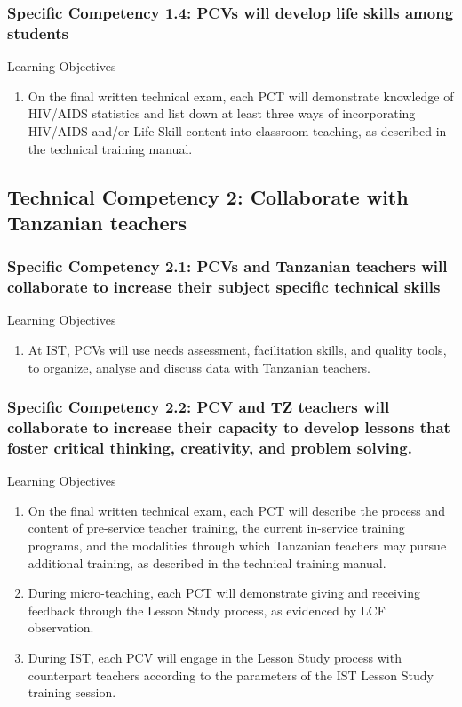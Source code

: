 \subsubsection*{Specific Competency 1.4: PCVs will develop life skills among students}

Learning Objectives
\begin{enumerate}
\item On the final written technical exam, each PCT will demonstrate knowledge of HIV/AIDS statistics and list down at least three ways of incorporating HIV/AIDS and/or Life Skill content into classroom teaching,
as described in the technical training manual.
\end{enumerate}

\subsection*{Technical Competency 2: Collaborate with Tanzanian teachers}

\subsubsection*{Specific Competency 2.1: PCVs and Tanzanian teachers
will collaborate to increase their subject specific technical skills}

Learning Objectives
\begin{enumerate}
\item At IST, PCVs will use needs assessment, facilitation skills, and quality
tools, to organize, analyse and discuss data with Tanzanian teachers.
\end{enumerate}

\subsubsection*{Specific Competency 2.2: PCV and TZ teachers will collaborate to increase their capacity to develop lessons
that foster critical thinking, creativity, and problem
solving.}

Learning Objectives
\begin{enumerate}
\item On the final written technical exam, each PCT will describe the process
and content of pre-service teacher training, the current in-service training programs, and the modalities through which Tanzanian teachers
may pursue additional training, as described in the technical training
manual.

\item During micro-teaching, each PCT will demonstrate giving and receiving feedback through the Lesson Study process, as evidenced by LCF
observation.

\item During IST, each PCV will engage in the Lesson Study process with
counterpart teachers according to the parameters of the IST Lesson
Study training session.
\end{enumerate}

